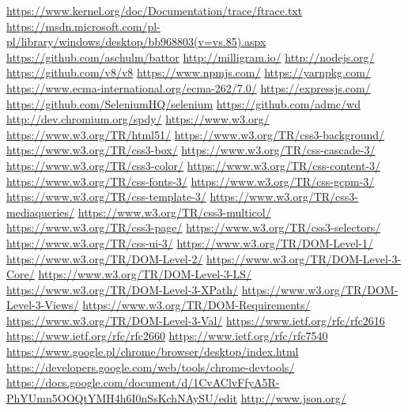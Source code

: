 \documentclass[polish, twoside, 12pt]{mwart}
\begin{document}
\begin{thebibliography}{11}
    \url{https://www.kernel.org/doc/Documentation/trace/ftrace.txt}
    \url{https://msdn.microsoft.com/pl-pl/library/windows/desktop/bb968803(v=vs.85).aspx}
    \url{https://github.com/aschulm/battor}
    \url{http://milligram.io/}
    \url{http://nodejs.org/}
    \url{https://github.com/v8/v8}
    \url{https://www.npmjs.com/}
    \url{https://yarnpkg.com/}
    \url{https://www.ecma-international.org/ecma-262/7.0/}
    \url{https://expressjs.com/}
    \url{https://github.com/SeleniumHQ/selenium}
    \url{https://github.com/admc/wd}
    \url{http://dev.chromium.org/spdy/}
    \url{https://www.w3.org/}
    \url{https://www.w3.org/TR/html51/}
    \url{https://www.w3.org/TR/css3-background/}
    \url{https://www.w3.org/TR/css3-box/}
    \url{https://www.w3.org/TR/css-cascade-3/}
    \url{https://www.w3.org/TR/css3-color/}
    \url{https://www.w3.org/TR/css-content-3/}
    \url{https://www.w3.org/TR/css-fonts-3/}
    \url{https://www.w3.org/TR/css-gcpm-3/}
    \url{https://www.w3.org/TR/css-template-3/}
    \url{https://www.w3.org/TR/css3-mediaqueries/}
    \url{https://www.w3.org/TR/css3-multicol/}
    \url{https://www.w3.org/TR/css3-page/}
    \url{https://www.w3.org/TR/css3-selectors/}
    \url{https://www.w3.org/TR/css-ui-3/}
    \url{https://www.w3.org/TR/DOM-Level-1/}
    \url{https://www.w3.org/TR/DOM-Level-2/}
    \url{https://www.w3.org/TR/DOM-Level-3-Core/}
    \url{https://www.w3.org/TR/DOM-Level-3-LS/}
    \url{https://www.w3.org/TR/DOM-Level-3-XPath/}
    \url{https://www.w3.org/TR/DOM-Level-3-Views/}
    \url{https://www.w3.org/TR/DOM-Requirements/}
    \url{https://www.w3.org/TR/DOM-Level-3-Val/}
    \url{https://www.ietf.org/rfc/rfc2616}
    \url{https://www.ietf.org/rfc/rfc2660}
    \url{https://www.ietf.org/rfc/rfc7540}
    \url{https://www.google.pl/chrome/browser/desktop/index.html}
    \url{https://developers.google.com/web/tools/chrome-devtools/}
    \url{https://docs.google.com/document/d/1CvAClvFfyA5R-PhYUmn5OOQtYMH4h6I0nSsKchNAySU/edit}
    \url{http://www.json.org/}
\end{thebibliography}
\end{document}
